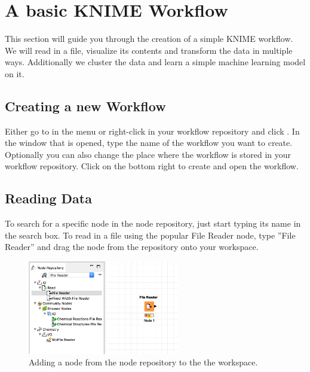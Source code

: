 
\section{A basic KNIME Workflow}

This section will guide you through the creation of a simple KNIME workflow. We will read in a file, visualize its contents and transform the data in multiple ways. Additionally we cluster the data and learn a simple machine learning model on it.

\subsection{Creating a new Workflow}

Either go to  in the menu or right-click in your workflow repository and click . In the window that is opened, type the name of the workflow you want to create. Optionally you can also change the place where the workflow is stored in your workflow repository. Click  on the bottom right to create and open the workflow.

\subsection{Reading Data}

To search for a specific node in the node repository, just start typing its name in the search box. To read in a file using the popular File Reader node, type ''File Reader'' and drag the node from the repository onto your workspace.

\begin{figure}[h]
\centering
\includegraphics[width=0.59\textwidth]{graphics/knime_basics/new_node}
\caption{Adding a node from the node repository to the the workspace.}
\label{fig:new_node}
\end{figure}

